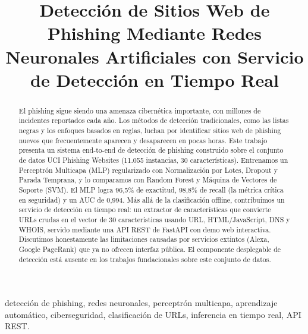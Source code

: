 \documentclass[conference]{IEEEtran}
\begin{document}
\title{Detección de Sitios Web de Phishing Mediante Redes Neuronales Artificiales con Servicio de Detección en Tiempo Real}

\author{
}

\maketitle

\begin{abstract}
El phishing sigue siendo una amenaza cibernética importante, con millones de incidentes reportados cada año. Los métodos de detección tradicionales, como las listas negras y los enfoques basados en reglas, luchan por identificar sitios web de phishing nuevos que frecuentemente aparecen y desaparecen en pocas horas. Este trabajo presenta un sistema end-to-end de detección de phishing construido sobre el conjunto de datos UCI Phishing Websites (11.055 instancias, 30 características). Entrenamos un Perceptrón Multicapa (MLP) regularizado con Normalización por Lotes, Dropout y Parada Temprana, y lo comparamos con Random Forest y Máquina de Vectores de Soporte (SVM). El MLP logra 96,5\% de exactitud, 98,8\% de recall (la métrica crítica en seguridad) y un AUC de 0,994. Más allá de la clasificación offline, contribuimos un servicio de detección en tiempo real: un extractor de características que convierte URLs crudas en el vector de 30 características usando URL, HTML/JavaScript, DNS y WHOIS, servido mediante una API REST de FastAPI con demo web interactiva. Discutimos honestamente las limitaciones causadas por servicios extintos (Alexa, Google PageRank) que ya no ofrecen interfaz pública. El componente desplegable de detección está ausente en los trabajos fundacionales sobre este conjunto de datos.
\end{abstract}

\begin{IEEEkeywords}
detección de phishing, redes neuronales, perceptrón multicapa, aprendizaje automático, ciberseguridad, clasificación de URLs, inferencia en tiempo real, API REST.
\end{IEEEkeywords}
\end{document}
